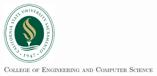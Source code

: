 \begin{titlepage}
\begin{center}
\begin{minipage}{.85\textwidth}
	\end{minipage}
	\end{center}
	\vfill
		
	\begin{center}
		\includegraphics[width=0.2\textwidth]{logo.png}\\
		\textsc{College of Engineering and Computer Science}\\
	\end{center}
\end{titlepage}